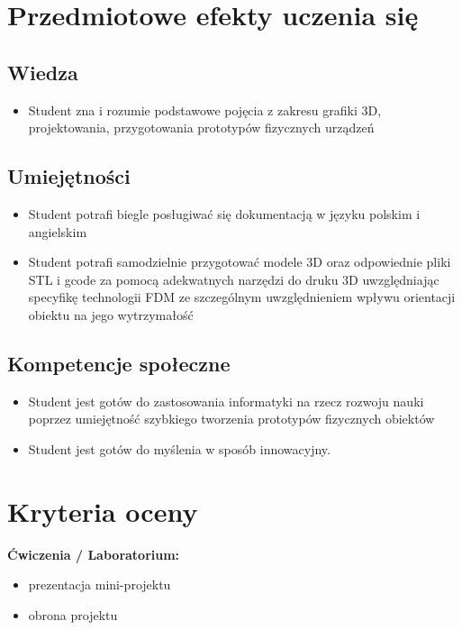 \documentclass[12pt, a4paper]{article}
\begin{document}
\section{Przedmiotowe efekty uczenia się}

\subsection*{Wiedza}
\begin{itemize}
  \item Student zna i rozumie podstawowe pojęcia z zakresu grafiki 3D, projektowania, przygotowania prototypów fizycznych urządzeń
\end{itemize}

\subsection*{Umiejętności}
\begin{itemize}
  \item Student potrafi biegle posługiwać się dokumentacją w języku polskim i angielskim
  \item Student potrafi samodzielnie przygotować modele 3D oraz odpowiednie pliki STL i gcode za pomocą adekwatnych narzędzi do druku 3D uwzględniając specyfikę technologii FDM ze szczególnym uwzględnieniem wpływu orientacji obiektu na jego wytrzymałość
\end{itemize}

\subsection*{Kompetencje społeczne}
\begin{itemize}
  \item Student jest gotów do zastosowania informatyki na rzecz rozwoju nauki poprzez umiejętność szybkiego tworzenia prototypów fizycznych obiektów
  \item Student jest gotów do myślenia w sposób innowacyjny.
\end{itemize}

\section{Kryteria oceny}

\textbf{Ćwiczenia / Laboratorium:}
\begin{itemize}
  \item prezentacja mini-projektu
  \item obrona projektu
\end{itemize}
\end{document}
